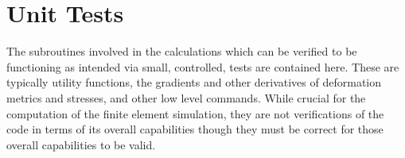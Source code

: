 \section{Unit Tests}

The subroutines involved in the calculations which can be verified to be functioning as intended via small, controlled, tests are contained here. These are typically utility functions, the gradients and other derivatives of deformation metrics and stresses, and other low level commands. While crucial for the computation of the finite element simulation, they are not verifications of the code in terms of its overall capabilities though they must be correct for those overall capabilities to be valid.

